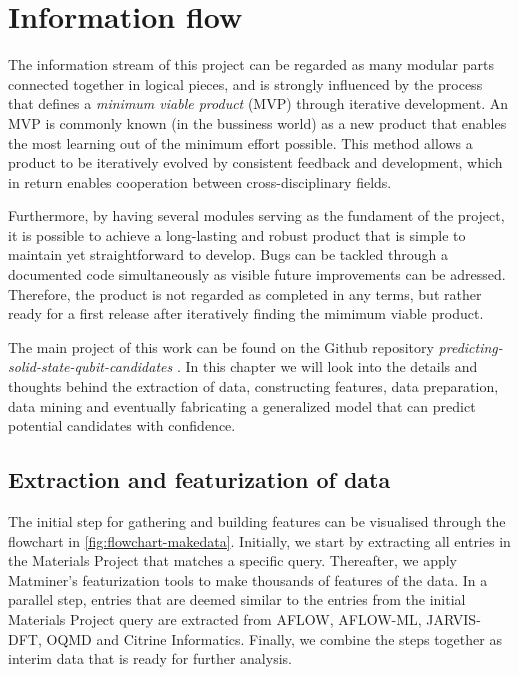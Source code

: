 \chapter{Information flow}

The information stream of this project can be regarded as many modular parts connected together in logical pieces, and is strongly influenced by the process that defines a \textit{minimum viable product} (MVP) through iterative development. An MVP is commonly known (in the bussiness world) as a new product that enables the most learning out of the minimum effort possible. This method allows a product to be iteratively evolved by consistent feedback and development, which in return enables cooperation between cross-disciplinary fields.

Furthermore, by having several modules serving as the fundament of the project, it is possible to achieve a long-lasting and robust product that is simple to maintain yet straightforward to develop. Bugs can be tackled through a documented code simultaneously as visible future improvements can be adressed. Therefore, the product is not regarded as completed in any terms, but rather ready for a first release after iteratively finding the mimimum viable product.

The main project of this work can be found on the Github repository \textit{predicting-solid-state-qubit-candidates} \cite{Ohebbi2021}. In this chapter we will look into the details and thoughts behind the extraction of data, constructing features, data preparation, data mining and eventually fabricating a generalized model that can predict potential candidates with confidence.

\section{Extraction and featurization of data}

The initial step for gathering and building features can be visualised through the flowchart in \autoref{fig:flowchart-makedata}. Initially, we start by extracting all entries in the Materials Project that matches a specific query. Thereafter, we apply Matminer's featurization tools to make thousands of features of the data. In a parallel step, entries that are deemed similar to the entries from the initial Materials Project query are extracted from AFLOW, AFLOW-ML, JARVIS-DFT, OQMD and Citrine Informatics. Finally, we combine the steps together as interim data that is ready for further analysis.

